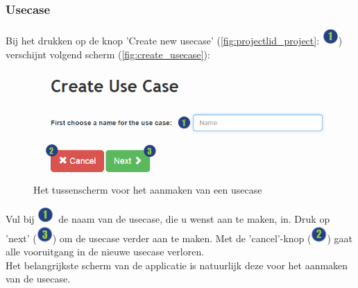 \documentclass[a4paper,11pt]{article}
\newcommand{\one}{\includegraphics[scale=0.5]{Gebruikershandleiding_img/1.png}}
\newcommand{\two}{\includegraphics[scale=0.5]{Gebruikershandleiding_img/2.png}}
\newcommand{\three}{\includegraphics[scale=0.5]{Gebruikershandleiding_img/3.png}}
\begin{document}
\subsubsection{Usecase}
\label{sec:usecase}
Bij het drukken op de knop 'Create new usecase' (\autoref{fig:projectlid_project}: \one) verschijnt volgend scherm (\autoref{fig:create_usecase}):

\begin{figure}[H]
\centering
\includegraphics[scale=0.5]{Gebruikershandleiding_img/create_usecase.png}
\caption{Het tussenscherm voor het aanmaken van een usecase}
\label{fig:create_usecase}
\end{figure}

Vul bij \one\ de naam van de usecase, die u wenst aan te maken, in. Druk op 'next' (\three) om de usecase verder aan te maken. Met de 'cancel'-knop (\two) gaat alle vooruitgang in de nieuwe usecase verloren.\\

Het belangrijkste scherm van de applicatie is natuurlijk deze voor het aanmaken van de usecase.
\end{document}
